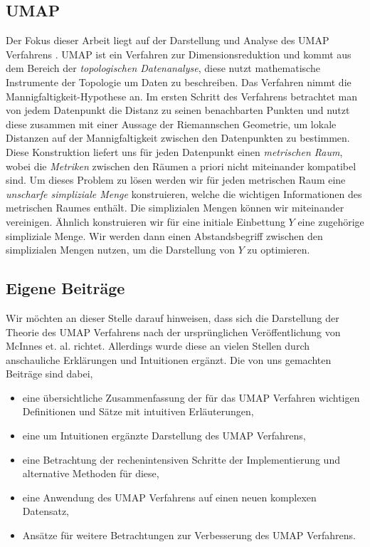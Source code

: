 \subsection*{UMAP}
	Der Fokus dieser Arbeit liegt auf der Darstellung und Analyse des UMAP Verfahrens \cite{UMAP}. 
	UMAP ist ein Verfahren zur Dimensionsreduktion und kommt aus dem Bereich der 
	\textit{topologischen Datenanalyse}, diese nutzt mathematische Instrumente der Topologie 
	um Daten zu beschreiben. 
	Das Verfahren nimmt die Mannigfaltigkeit-Hypothese an. Im ersten Schritt des Verfahrens 
	betrachtet man von jedem Datenpunkt die Distanz zu seinen benachbarten Punkten und nutzt diese 
	zusammen mit einer Aussage der Riemannschen Geometrie, um lokale Distanzen auf der Mannigfaltigkeit 
	zwischen den Datenpunkten zu bestimmen. Diese Konstruktion liefert uns für jeden Datenpunkt 
	einen \textit{metrischen Raum}, wobei die \textit{Metriken} zwischen den Räumen a priori 
	nicht miteinander kompatibel sind. Um dieses Problem zu lösen werden wir für jeden metrischen Raum eine 
	\textit{unscharfe simpliziale Menge} konstruieren, welche die wichtigen Informationen des 
	metrischen Raumes enthält. Die simplizialen Mengen können wir miteinander vereinigen. Ähnlich konstruieren wir 
	für eine initiale Einbettung $Y$ eine zugehörige simpliziale Menge. Wir werden dann einen Abstandsbegriff 
	zwischen den simplizialen Mengen nutzen, um die Darstellung von $Y$ zu optimieren. 

\subsection*{Eigene Beiträge}
	Wir möchten an dieser Stelle darauf hinweisen, dass sich die Darstellung der Theorie des UMAP Verfahrens 
	nach der ursprünglichen Veröffentlichung von McInnes et. al. \cite{UMAP} richtet. Allerdings 
	wurde diese an vielen Stellen durch anschauliche Erklärungen und Intuitionen ergänzt. 
	Die von uns gemachten Beiträge sind dabei, 

	\begin{itemize}
		\item eine übersichtliche Zusammenfassung der für das UMAP Verfahren wichtigen Definitionen 
			  und Sätze mit intuitiven Erläuterungen,  
		\item eine um Intuitionen ergänzte Darstellung des UMAP Verfahrens, 
		\item eine Betrachtung der rechenintensiven Schritte der Implementierung und alternative Methoden für diese, 
		\item eine Anwendung des UMAP Verfahrens auf einen neuen komplexen Datensatz, 
		\item Ansätze für weitere Betrachtungen zur Verbesserung des UMAP Verfahrens.
	\end{itemize}


